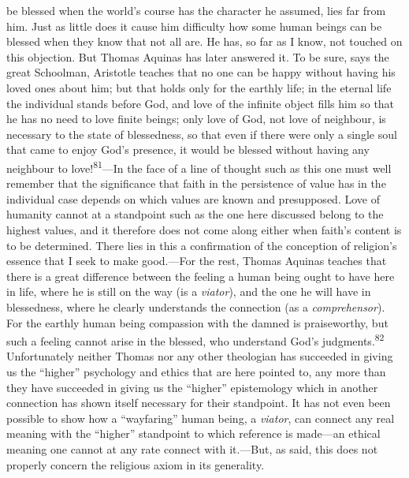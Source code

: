 \documentclass[12pt,a4paper]{book}
\newcommand{\opage}[1]{\marginnote{\footnotesize\textit{[#1]}}}
\begin{document}
be blessed when the world's course has the character he assumed, lies far from him. Just as little
does it cause him difficulty how some human beings can be blessed when they know that not all are.
He has, so far as I know, not touched on this objection. But Thomas Aquinas has later answered it.
To be sure, says the great Schoolman, Aristotle teaches that no one can be happy without having his
loved ones about him; but that holds only for the earthly life; in the eternal life the individual
stands before God, and love of the infinite object fills him so that he has no need to love finite
beings; only love of God, not love of neighbour, is necessary to the state of blessedness, so that
even if there were only a single soul that came to enjoy God's presence, it would be blessed without
having any neighbour to love!\textsuperscript{81}---In the face of a line of thought such as this
one must well remember that the significance that faith in the persistence of value has in the
individual case depends on which values are known and presupposed. Love of humanity cannot at a
standpoint such as the one here discussed belong to the 
\opage{162}highest values, and it therefore does not
come along either when faith's content is to be determined. There lies in this a confirmation of the
conception of religion's essence that I seek to make good.---For the rest, Thomas Aquinas teaches
that there is a great difference between the feeling a human being ought to have here in life, where
he is still on the way (is a \emph{viator}), and the one he will have in blessedness, where he
clearly understands the connection (as a \emph{comprehensor}). For the earthly human being compassion
with the damned is praiseworthy, but such a feeling cannot arise in the blessed, who understand God's
judgments.\textsuperscript{82} Unfortunately neither Thomas nor any other theologian has succeeded in
giving us the ``higher'' psychology and ethics that are here pointed to, any more than they have
succeeded in giving us the ``higher'' epistemology which in another connection has shown itself
necessary for their standpoint. It has not even been possible to show how a ``wayfaring'' human
being, a \textit{viator}, can connect any real meaning with the ``higher'' standpoint to which
reference is made---an ethical meaning one cannot at any rate connect with it.---But, as said, this
does not properly concern the religious axiom in its generality.
\end{document}
